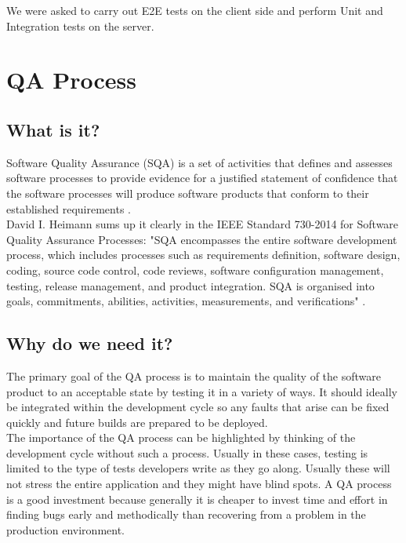 We were asked to carry out E2E tests on the client side and perform Unit and Integration tests on the server.

\section{QA Process}
\label{sec:qa-process}

\subsection{What is it?}
\label{subsec:qa-process-what-is-it}
Software Quality Assurance (SQA) is a set of activities that defines and assesses software processes to provide evidence for a justified statement of confidence that the software processes will produce software products that conform to their established requirements \cite{qa-standard}.
\\

David I. Heimann sums up it clearly in the IEEE Standard 730-2014 for Software Quality Assurance Processes: "SQA encompasses the entire software development process, which includes processes such as requirements definition, software design, coding, source code control, code reviews, software configuration management, testing, release management, and product integration. SQA is organised into goals, commitments, abilities, activities, measurements, and verifications" \cite{project-quality-management}.

\subsection{Why do we need it?}
\label{subsec:qa-process-why-do-we-need-it}
The primary goal of the QA process is to maintain the quality of the software product to an acceptable state by testing it in a variety of ways. It should ideally be integrated within the development cycle so any faults that arise can be fixed quickly and future builds are prepared to be deployed.
\\

The importance of the QA process can be highlighted by thinking of the development cycle without such a process. Usually in these cases, testing is limited to the type of tests developers write as they go along. Usually these will not stress the entire application and they might have blind spots. A QA process is a good investment because generally it is cheaper to invest time and effort in finding bugs early and methodically than recovering from a problem in the production environment.

